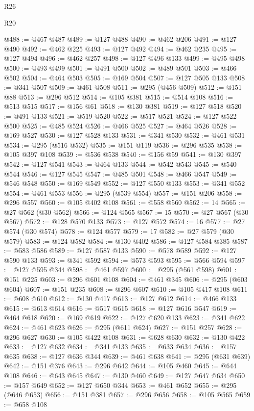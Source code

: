 \begin{lexlean}{R26}
\begin{lexlean}{R20}
\begin{coremodule}
{{{{{{{{{{{{{{{{{{{{{{{{{{{{{{{{{{{{{{{{{{{{{{{{{{{{{{{{{{{{{{{@488 := @467 @487
@489 := @127 @488
@490 := @462 @206
@491 := @127 @490
@492 := @462 @225
@493 := @127 @492
@494 := @462 @235
@495 := @127 @494
@496 := @462 @257
@498 := @127 @496 @133
@499 := @495 @498
@500 := @493 @499
@501 := @491 @500
@502 := @489 @501
@503 := @466 @502
@504 := @464 @503
@505 := @169 @504
@507 := @127 @505 @133
@508 := @341 @507
@509 := @461 @508
@511 := @295 (@456 @509)
@512 := @151 @88
@513 := @296 @512
@514 := @105 @381
@515 := @514 @108
@516 := @513 @515
@517 := @156 @61
@518 := @130 @381
@519 := @127 @518
@520 := @491 @133
@521 := @519 @520
@522 := @517 @521
@524 := @127 @522 @500
@525 := @485 @524
@526 := @466 @525
@527 := @464 @526
@528 := @169 @527
@530 := @127 @528 @133
@531 := @341 @530
@532 := @461 @531
@534 := @295 (@516 @532)
@535 := @151 @119
@536 := @296 @535
@538 := @105 @397 @108
@539 := @536 @538
@540 := @156 @59
@541 := @130 @397
@542 := @127 @541
@543 := @464 @133
@544 := @542 @543
@545 := @540 @544
@546 := @127 @545
@547 := @485 @501
@548 := @466 @547
@549 := @546 @548
@550 := @169 @549
@552 := @127 @550 @133
@553 := @341 @552
@554 := @461 @553
@556 := @295 (@539 @554)
@557 := @151 @206
@558 := @296 @557
@560 := @105 @402 @108
@561 := @558 @560
@562 := 14
@565 := @27 @562 (@30 @562)
@566 := @124 @565
@567 := 15
@570 := @27 @567 (@30 @567)
@572 := @128 @570 @133
@573 := @127 @572
@574 := 16
@577 := @27 @574 (@30 @574)
@578 := @124 @577
@579 := 17
@582 := @27 @579 (@30 @579)
@583 := @124 @582
@584 := @130 @402
@586 := @127 @584 @385
@587 := @583 @586
@589 := @127 @587 @133
@590 := @578 @589
@592 := @127 @590 @133
@593 := @341 @592
@594 := @573 @593
@595 := @566 @594
@597 := @127 @595 @344
@598 := @461 @597
@600 := @295 (@561 @598)
@601 := @151 @225
@603 := @296 @601 @108
@604 := @461 @345
@606 := @295 (@603 @604)
@607 := @151 @235
@608 := @296 @607
@610 := @105 @417 @108
@611 := @608 @610
@612 := @130 @417
@613 := @127 @612
@614 := @466 @133
@615 := @613 @614
@616 := @517 @615
@618 := @127 @616 @547
@619 := @464 @618
@620 := @169 @619
@622 := @127 @620 @133
@623 := @341 @622
@624 := @461 @623
@626 := @295 (@611 @624)
@627 := @151 @257
@628 := @296 @627
@630 := @105 @422 @108
@631 := @628 @630
@632 := @130 @422
@633 := @127 @632
@634 := @341 @133
@635 := @633 @634
@636 := @157 @635
@638 := @127 @636 @344
@639 := @461 @638
@641 := @295 (@631 @639)
@642 := @151 @376
@643 := @296 @642
@644 := @105 @460
@645 := @644 @108
@646 := @643 @645
@647 := @130 @460
@649 := @127 @647 @634
@650 := @157 @649
@652 := @127 @650 @344
@653 := @461 @652
@655 := @295 (@646 @653)
@656 := @151 @381
@657 := @296 @656
@658 := @105 @565
@659 := @658 @108
}}}}}}}}}}}}}}}}}}}}}}}}}}}}}}}}}}}}}}}}}}}}}}}}}}}}}}}}}}}}}}}
\end{coremodule}
\end{lexlean}
\end{lexlean}
